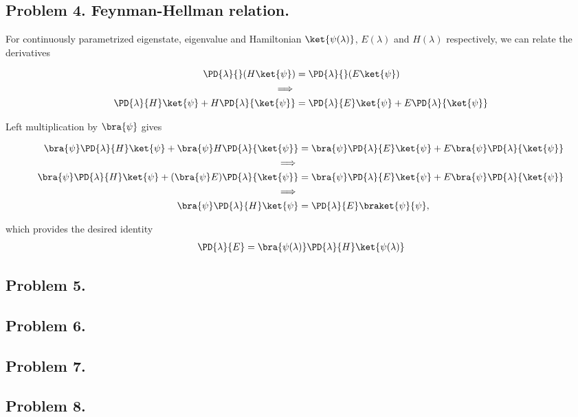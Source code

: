 \subsection{Problem 4. Feynman-Hellman relation.}

For continuously parametrized eigenstate, eigenvalue and Hamiltonian $\ket{\psi(\lambda)}$, $E(\lambda)$ and $H(\lambda)$ respectively, we can relate the derivatives

\begin{align*}
\PD{\lambda}{} ( H \ket{\psi} ) &= \PD{\lambda}{} ( E \ket{\psi} ) \\
\implies \\
\PD{\lambda}{H} \ket{\psi} +H \PD{\lambda}{\ket{\psi}} &= \PD{\lambda}{E} \ket{\psi} + E \PD{\lambda}{\ket{\psi} } 
\end{align*}

Left multiplication by $\bra{\psi}$ gives

\begin{align*}
\bra{\psi}\PD{\lambda}{H} \ket{\psi} +\bra{\psi}H \PD{\lambda}{\ket{\psi}} &= \bra{\psi}\PD{\lambda}{E} \ket{\psi} +  E \bra{\psi}\PD{\lambda}{\ket{\psi} } \\
\implies \\
\bra{\psi}\PD{\lambda}{H} \ket{\psi} +(\bra{\psi}E) \PD{\lambda}{\ket{\psi}} &= \bra{\psi}\PD{\lambda}{E} \ket{\psi} +  E \bra{\psi}\PD{\lambda}{\ket{\psi} } \\
\implies \\
\bra{\psi}\PD{\lambda}{H} \ket{\psi} &= \PD{\lambda}{E} \braket{\psi}{\psi},
\end{align*}

which provides the desired identity
\begin{align}\label{eqn:desaiCh3:4}
\PD{\lambda}{E} 
= \bra{\psi(\lambda)}\PD{\lambda}{H} \ket{\psi(\lambda)}
\end{align}

\subsection{Problem 5. }
\subsection{Problem 6. }
\subsection{Problem 7. }
\subsection{Problem 8. }
